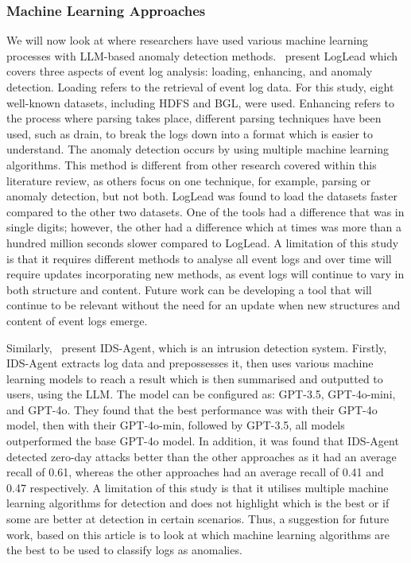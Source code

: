 \subsubsection{Machine Learning Approaches}
We will now look at where researchers have used various machine learning processes with LLM-based anomaly detection methods.~\cite{10589612} present LogLead which covers three aspects of event log analysis: loading, enhancing, and anomaly detection. Loading refers to the retrieval of event log data. For this study, eight well-known datasets, including HDFS and BGL, were used. Enhancing refers to the process where parsing takes place, different parsing techniques have been used, such as drain, to break the logs down into a format which is easier to understand. The anomaly detection occurs by using multiple machine learning algorithms. This method is different from other research covered within this literature review, as others focus on one technique, for example, parsing or anomaly detection, but not both. LogLead was found to load the datasets faster compared to the other two datasets. One of the tools had a difference that was in single digits; however, the other had a difference which at times was more than a hundred million seconds slower compared to LogLead. A limitation of this study is that it requires different methods to analyse all event logs and over time will require updates incorporating new methods, as event logs will continue to vary in both structure and content. Future work can be developing a tool that will continue to be relevant without the need for an update when new structures and content of event logs emerge. 

Similarly,~\cite{li2024ids} present IDS-Agent, which is an intrusion detection system. Firstly, IDS-Agent extracts log data and prepossesses it, then uses various machine learning models to reach a result which is then summarised and outputted to users, using the LLM. The model can be configured as: GPT-3.5, GPT-4o-mini, and GPT-4o. They found that the best performance was with their GPT-4o model, then with their GPT-4o-min, followed by GPT-3.5, all models outperformed the base GPT-4o model. In addition, it was found that IDS-Agent detected zero-day attacks better than the other approaches as it had an average recall of 0.61, whereas the other approaches had an average recall of 0.41 and 0.47 respectively. A limitation of this study is that it utilises multiple machine learning algorithms for detection and does not highlight which is the best or if some are better at detection in certain scenarios. Thus, a suggestion for future work, based on this article is to look at which machine learning algorithms are the best to be used to classify logs as anomalies. 

